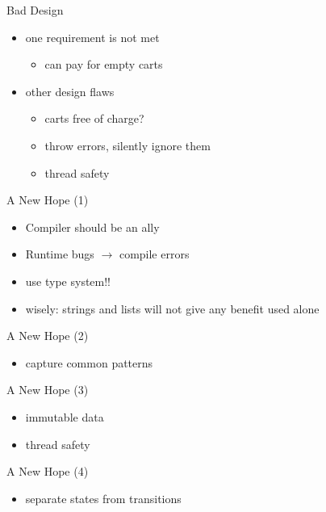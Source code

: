 \documentclass{beamer}
\begin{document}
\begin{frame}{Bad Design}
  \begin{itemize}[<+->]
    \item one requirement is not met
    \begin{itemize}
      \item can pay for empty carts
    \end{itemize}
    \item other design flaws
    \begin{itemize}
      \item carts free of charge?
      \item throw errors, silently ignore them
      \item thread safety
    \end{itemize}
  \end{itemize}
\end{frame}

\begin{frame}{A New Hope (1)}
  \begin{itemize}
    \item Compiler should be an ally
    \item Runtime bugs $\rightarrow$ compile errors
    \item use type system!!
    \item wisely: strings and lists will not give any benefit used alone
  \end{itemize}
\end{frame}

\begin{frame}{A New Hope (2)}
  \begin{itemize}
    \item capture common patterns
  \end{itemize}
\end{frame}


\begin{frame}{A New Hope (3)}
  \begin{itemize}[<+->]
    \item immutable data
    \item thread safety
  \end{itemize}
\end{frame}

\begin{frame}{A New Hope (4)}
  \begin{itemize}
    \item separate states from transitions
  \end{itemize}
  \centering
\end{frame}
\end{document}
